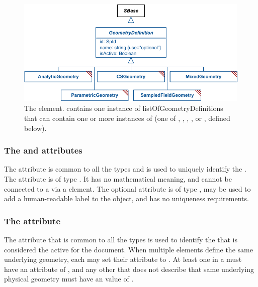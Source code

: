 \begin{figure}[ht]
  \includegraphics{figs/GeometryDefinition-uml}
  \caption{The \GeometryDefinition element. \Geometry contains one instance of listOfGeometryDefinitions that can contain one or more instances of \GeometryDefinition (one of \AnalyticGeometry, \SampledFieldGeometry, \CSGeometry, \ParametricGeometry, or \MixedGeometry, defined below).}
  \label{GeometryDefinition-uml}
\end{figure}

\subsubsection{The \fixttspace{} and \fixttspace{} attributes}
The  attribute is common to all the \GeometryDefinition types and is used to uniquely identify the \GeometryDefinition. The attribute is of type .  It has no mathematical meaning, and cannot be connected to a \Parameter via a \SpatialSymbolReference element.  The optional  attribute is of type , may be used to add a human-readable label to the object, and has no uniqueness requirements.

\subsubsection{The \fixttspace{} attribute}
The  attribute that is common to all the \GeometryDefinition types is used to identify the \GeometryDefinition that is considered the active \GeometryDefinition for the document.  When multiple \GeometryDefinition elements define the same underlying geometry, each may set their  attribute to .  At least one \GeometryDefinition in a \Model must have an  attribute of , and any other \GeometryDefinition that does not describe that same underlying physical geometry must have an  value of .

